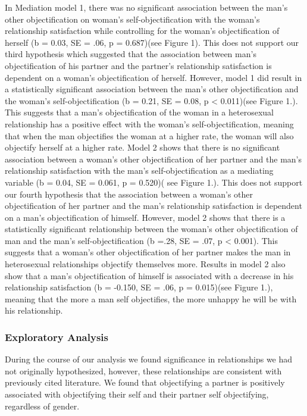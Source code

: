 \documentclass[
  man]{apa6}
\begin{document}
In Mediation model 1, there was no significant association between the man's other objectification on woman's self-objectification with the woman's relationship satisfaction while controlling for the woman's objectification of herself (b = 0.03, SE = .06, p = 0.687)(see Figure 1). This does not support our third hypothesis which suggested that the association between man's objectification of his partner and the partner's relationship satisfaction is dependent on a woman's objectification of herself. However, model 1 did result in a statistically significant association between the man's other objectification and the woman's self-objectification (b = 0.21, SE = 0.08, p \textless{} 0.011)(see Figure 1.). This suggests that a man's objectification of the woman in a heterosexual relationship has a positive effect with the woman's self-objectification, meaning that when the man objectifies the woman at a higher rate, the woman will also objectify herself at a higher rate.
Model 2 shows that there is no significant association between a woman's other objectification of her partner and the man's relationship satisfaction with the man's self-objectification as a mediating variable (b = 0.04, SE = 0.061, p = 0.520)( see Figure 1.). This does not support our fourth hypothesis that the association between a woman's other objectification of her partner and the man's relationship satisfaction is dependent on a man's objectification of himself. However, model 2 shows that there is a statistically significant relationship between the woman's other objectification of man and the man's self-objectification (b =.28, SE = .07, p \textless{} 0.001). This suggests that a woman's other objectification of her partner makes the man in heterosexual relationships objectify themselves more. Results in model 2 also show that a man's objectification of himself is associated with a decrease in his relationship satisfaction (b = -0.150, SE = .06, p = 0.015)(see Figure 1.), meaning that the more a man self objectifies, the more unhappy he will be with his relationship.

\hypertarget{exploratory-analysis}{%
\subsubsection{Exploratory Analysis}\label{exploratory-analysis}}

During the course of our analysis we found significance in relationships we had not originally hypothesized, however, these relationships are consistent with previously cited literature. We found that objectifying a partner is positively associated with objectifying their self and their partner self objectifying, regardless of gender.
\end{document}
